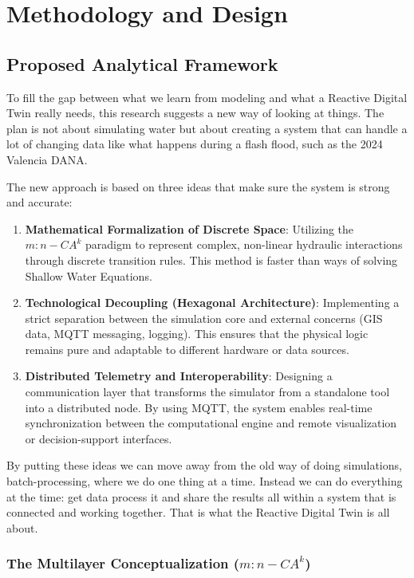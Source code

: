 \chapter{Methodology and Design}
\label{chapter:methodology_and_design}

\section{Proposed Analytical Framework}

To fill the gap between what we learn from modeling and what a Reactive Digital Twin really needs, this research suggests a new way of 
looking at things. The plan is not about simulating water but about creating a system that can handle a lot of changing data like what 
happens during a flash flood, such as the 2024 Valencia DANA.

The new approach is based on three ideas that make sure the system is strong and accurate:

\begin{enumerate}
    \item \textbf{Mathematical Formalization of Discrete Space}: Utilizing the $m:n-CA^k$ paradigm to represent complex, non-linear hydraulic interactions through discrete transition rules. This method is faster than ways of solving Shallow Water Equations.
    \item \textbf{Technological Decoupling (Hexagonal Architecture)}: Implementing a strict separation between the simulation core and external concerns (GIS data, MQTT messaging, logging). This ensures that the physical logic remains pure and adaptable to different hardware or data sources.
    \item \textbf{Distributed Telemetry and Interoperability}: Designing a communication layer that transforms the simulator from a standalone tool into a distributed node. By using MQTT, the system enables real-time synchronization between the computational engine and remote visualization or decision-support interfaces.
\end{enumerate}

By putting these ideas we can move away from the old way of doing simulations, batch-processing, where we do one thing at a time. 
Instead we can do everything at the time: get data process it and share the results all within a system that is connected and working 
together. That is what the Reactive Digital Twin is all about.


\subsection{The Multilayer Conceptualization ($m:n-CA^k$)}

